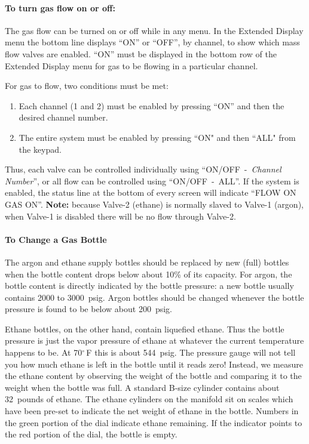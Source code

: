 {%
\paragraph{To turn gas flow on or off:}

The gas flow can be turned on or off while in any menu.  In the
Extended Display menu the bottom line displays ``ON'' or ``OFF'', by
channel, to show which mass flow valves are enabled.  ``ON'' must be
displayed in the bottom row of the Extended Display menu for gas to be
flowing in a particular channel.

For gas to flow, two conditions must be met:
\begin{enumerate}
\item Each channel (1 and 2) must be enabled by pressing ``ON'' and then the
  desired channel number.
\item The entire system must be enabled by pressing ``ON" and then ``ALL" from
  the keypad.
\end{enumerate}
Thus, each valve can be controlled individually using ``ON/OFF~-~\emph{Channel
Number}'', or all flow can be controlled using ``ON/OFF~-~ALL''. If the system
is enabled, the status line at the bottom of every screen will indicate ``FLOW
ON GAS ON''. {\bf Note:} because Valve-2 (ethane) is normally slaved to Valve-1
(argon), when Valve-1 is disabled there will be no flow through Valve-2.

\paragraph{To Change a Gas Bottle}

The argon and ethane supply bottles should be replaced by new (full)
bottles when the bottle content drops below about 10\% of its
capacity.  For argon, the bottle content is directly indicated by the
bottle pressure: a new bottle usually contains 2000 to
3000~psig. Argon bottles should be changed whenever the bottle
pressure is found to be below about 200~psig.

Ethane bottles, on the
other hand, contain liquefied ethane. Thus the bottle pressure is just
the vapor pressure of ethane at whatever the current temperature
happens to be. At 70$^\circ$\,F this is about 544~psig. The pressure gauge
will not tell you how much ethane is left in the bottle until it reads
zero! Instead, we measure the ethane content by observing the weight
of the bottle and comparing it to the weight when the bottle was
full. A standard B-size cylinder contains about 32~pounds of ethane.
The ethane cylinders on the manifold sit on scales which have been
pre-set to indicate the net weight of ethane in the bottle.
Numbers in the green portion of the dial indicate ethane remaining.
If the indicator points to the red portion of the dial, the bottle
is empty.

}
